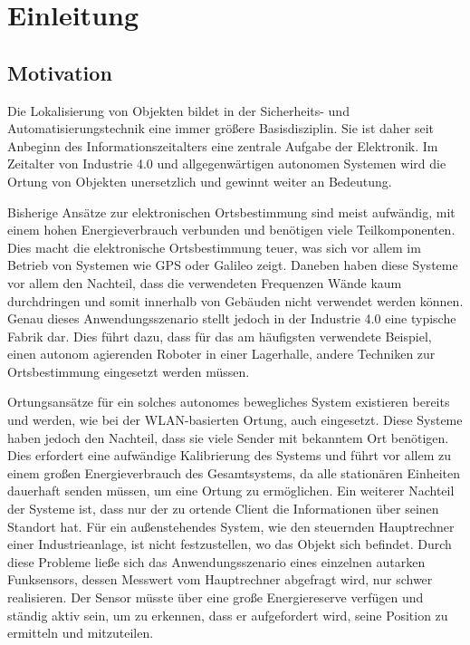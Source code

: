 
\chapter{Einleitung}
\label{sec:Einleitung}
\pagestyle{scrheadings}



\section{Motivation}
Die Lokalisierung von Objekten bildet in der Sicherheits- und Automatisierungstechnik eine immer größere Basisdisziplin. Sie ist daher seit Anbeginn des Informationszeitalters eine zentrale Aufgabe der Elektronik. Im Zeitalter von Industrie 4.0 und allgegenwärtigen autonomen Systemen wird die Ortung von Objekten unersetzlich und gewinnt weiter an Bedeutung.


Bisherige Ansätze zur elektronischen Ortsbestimmung sind meist aufwändig, mit einem hohen Energieverbrauch verbunden und benötigen viele Teilkomponenten. Dies macht die elektronische Ortsbestimmung teuer, was sich vor allem im Betrieb von Systemen wie GPS oder Galileo zeigt. Daneben haben diese Systeme vor allem den Nachteil, dass die verwendeten Frequenzen Wände kaum durchdringen und somit innerhalb von Gebäuden nicht verwendet werden können. Genau dieses Anwendungsszenario stellt jedoch in der Industrie 4.0 eine typische Fabrik dar. Dies führt dazu, dass für das am häufigsten verwendete Beispiel, einen autonom agierenden Roboter in einer Lagerhalle, andere Techniken zur Ortsbestimmung eingesetzt werden müssen. 

Ortungsansätze für ein solches autonomes bewegliches System existieren bereits und werden, wie bei der WLAN-basierten Ortung, auch eingesetzt. Diese Systeme haben jedoch den Nachteil, dass sie viele Sender mit bekanntem Ort benötigen. Dies erfordert eine aufwändige Kalibrierung des Systems und führt vor allem zu einem großen Energieverbrauch des Gesamtsystems, da alle stationären Einheiten dauerhaft senden müssen, um eine Ortung zu ermöglichen.
Ein weiterer Nachteil der Systeme ist, dass nur der zu ortende Client die Informationen über seinen Standort hat. Für ein außenstehendes System, wie den steuernden Hauptrechner einer Industrieanlage, ist nicht festzustellen, wo das Objekt sich befindet. 
Durch diese Probleme ließe sich das Anwendungsszenario eines einzelnen autarken Funksensors, dessen Messwert vom Hauptrechner abgefragt wird, nur schwer realisieren. Der Sensor müsste über eine große Energiereserve verfügen und ständig aktiv sein, um zu erkennen, dass er aufgefordert wird, seine Position zu ermitteln und mitzuteilen.

